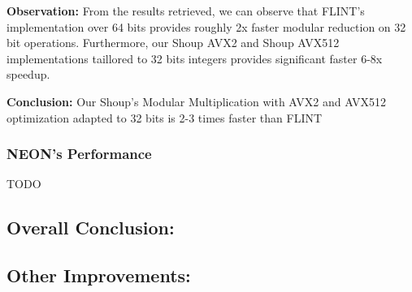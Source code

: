 \documentclass{article}
\begin{document}
\textbf{Observation:}
From the results retrieved, we can observe that FLINT's implementation over 64 bits provides roughly 2x
faster modular reduction on 32 bit operations. Furthermore, our Shoup AVX2 and Shoup AVX512 implementations
taillored to 32 bits integers provides significant faster 6-8x speedup.

\textbf{Conclusion:}
Our Shoup's Modular Multiplication with AVX2 and AVX512 optimization adapted to 32 bits is 2-3 times faster than FLINT

\subsubsection{NEON's Performance}
TODO

\subsection{Overall Conclusion:}

\subsection{Other Improvements:}
\end{document}

